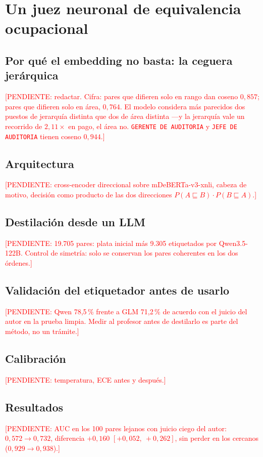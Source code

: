 \documentclass[12pt,a4paper,oneside]{report}
\newcommand{\pend}[1]{\textcolor{red}{\small[PENDIENTE: #1]}}
\newcommand{\cargo}[1]{\texttt{#1}}
\begin{document}
\chapter{Un juez neuronal de equivalencia ocupacional}
\label{cap:juez}

\section{Por qué el embedding no basta: la ceguera jerárquica}
\pend{redactar. Cifra: pares que difieren solo en rango dan coseno $0{,}857$; pares que
difieren solo en área, $0{,}764$. El modelo considera más parecidos dos puestos de
jerarquía distinta que dos de área distinta ---y la jerarquía vale un recorrido de
$2{,}11\times$ en pago, el área no. \cargo{GERENTE DE AUDITORIA} y \cargo{JEFE DE
AUDITORIA} tienen coseno $0{,}944$.}

\section{Arquitectura}
\pend{cross-encoder direccional sobre mDeBERTa-v3-xnli, cabeza de motivo, decisión como
producto de las dos direcciones $P(A \sqsubseteq B)\cdot P(B \sqsubseteq A)$.}

\section{Destilación desde un LLM}
\pend{19.705 pares: plata inicial más 9.305 etiquetados por Qwen3.5-122B. Control de
simetría: solo se conservan los pares coherentes en los dos órdenes.}

\section{Validación del etiquetador antes de usarlo}
\pend{Qwen 78,5\,\% frente a GLM 71,2\,\% de acuerdo con el juicio del autor en la prueba
limpia. Medir al profesor antes de destilarlo es parte del método, no un trámite.}

\section{Calibración}
\pend{temperatura, ECE antes y después.}

\section{Resultados}
\pend{AUC en los 100 pares lejanos con juicio ciego del autor: $0{,}572 \to 0{,}732$,
diferencia $+0{,}160$ $[+0{,}052,\ +0{,}262]$, sin perder en los cercanos
($0{,}929 \to 0{,}938$).}
\end{document}
